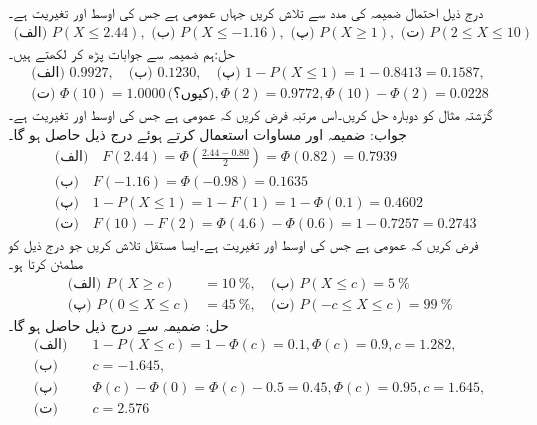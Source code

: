 درج ذیل احتمال ضمیمہ  کی مدد سے تلاش کریں جہاں  عمومی ہے جس کی اوسط  اور تغیریت  ہے۔
\begin{align*}
\text{(الف)}\,\,P(X\le 2.44),\,\, \text{(ب)}\,\,P(X\le -1.16),\,\,\text{(پ)}\,\,P(X\ge 1),\,\, \text{(ت)}\,\,P(2\le X\le 10)
\end{align*}
حل:\quad ہم ضمیمہ  سے جوابات پڑھ کر لکھتے ہیں۔
\begin{align*}
\text{(الف)}\,\,0.9927,\quad \text{(ب)}\,\,0.1230, \quad \text{(پ)}\,\,1-P(X\le 1)=1-0.8413=0.1587,\\
\text{(ت)}\,\,\Phi(10)=1.0000 \,\text{(کیوں؟)}, \Phi(2)=0.9772,\Phi(10)-\Phi(2)=0.0228
\end{align*}
\quad
گزشتہ مثال کو دوبارہ حل کریں۔اس مرتبہ فرض کریں کہ عمومی ہے جس کی اوسط  اور تغیریت  ہے۔\\
جواب:\quad
ضمیمہ  اور مساوات  استعمال کرتے ہوئے درج ذیل حاصل ہو گا۔
\begin{align*}
& \text{(الف)} \quad F(2.44)=\Phi(\frac{2.44-0.80}{2})=\Phi(0.82)=0.7939\\
& \text{(ب)} \quad F(-1.16)=\Phi(-0.98)=0.1635\\
& \text{(پ)} \quad 1-P(X\le 1)=1-F(1)=1-\Phi(0.1)=0.4602\\
& \text{(ت)} \quad F(10)-F(2)=\Phi(4.6)-\Phi(0.6)=1-0.7257=0.2743
\end{align*}
\quad
فرض کریں کہ  عمومی ہے جس کی اوسط  اور تغیریت  ہے۔ایسا مستقل  تلاش کریں جو درج ذیل کو مطمئن کرتا ہو۔
\begin{align*}
\text{(الف)}  \,\, P(X\ge c)&=\SI{10}{\percent},\quad \text{(ب)}  \,\,P(X\le c)=\SI{5}{\percent}\\
\text{(پ)}  \,\, P(0\le X\le c)&=\SI{45}{\percent},\quad \text{(ت)} \,\,P(-c\le X\le c)=\SI{99}{\percent}
\end{align*}
حل:\quad
ضمیمہ  سے  درج ذیل حاصل ہو گا۔
\begin{align*}
\text{(الف)}  \quad & 1-P(X\le c)=1-\Phi(c)=0.1, \Phi(c)=0.9, c=1.282,\\
\text{(ب)}  \quad & c=-1.645,\\
\text{(پ)} \quad &\Phi(c)-\Phi(0)=\Phi(c)-0.5=0.45,\Phi(c)=0.95,c=1.645,\\
\text{(ت)} \quad & c=2.576
\end{align*}
